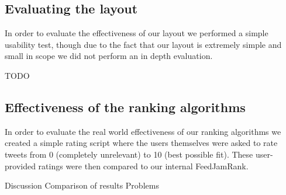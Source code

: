\subsection{Evaluating the layout} %
In order to evaluate the effectiveness of our layout we performed a simple usability test, though due to the fact that our layout is extremely simple and small in scope we did not perform an in depth evaluation.

TODO

\subsection{Effectiveness of the ranking algorithms}
In order to evaluate the real world effectiveness of our ranking algorithms we created a simple rating script where the users themselves were asked to rate tweets from 0 (completely unrelevant) to 10 (best possible fit). These user-provided ratings were then compared to our internal FeedJamRank.

Discussion
Comparison of results
Problems
